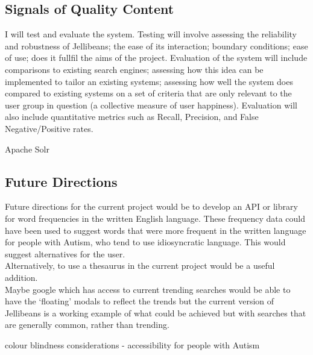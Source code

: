 \documentclass[a4paper, 11pt]{article}
\begin{document}
\subsection{Signals of Quality Content}
I will test and evaluate the system. Testing will involve assessing the reliability and robustness of Jellibeans; the ease of its interaction; boundary conditions; ease of use; does it fullfil the aims of the project.
Evaluation of the system will include comparisons to existing search engines; assessing how this idea can be implemented to tailor an existing systems; assessing how well the system does compared to existing systems on a set of criteria that are only relevant to the user group in question (a collective measure of user happiness). Evaluation will also include quantitative metrics such as Recall, Precision, and False Negative/Positive rates.


Apache Solr\\

\subsection{Future Directions}
Future directions for the current project would be to develop an API or library for word frequencies in the written English language. These frequency data could have been used to suggest words that were more frequent in the written language for people with Autism, who tend to use idiosyncratic language. This would suggest alternatives for the user.\\

Alternatively, to use a thesaurus in the current project would be a useful addition.\\

Maybe google which has access to current trending searches would be able to have the `floating' modals to reflect the trends but the current version of Jellibeans is a working example of what could be achieved but with searches that are generally common, rather than trending.

colour blindness considerations - accessibility for people with Autism  
\end{document}
